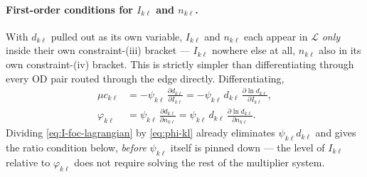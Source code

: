 \documentclass[12pt, a4paper]{article}
\theoremstyle{definition}
\theoremstyle{remark}
\begin{document}
\paragraph{First-order conditions for $I_{k\ell}$ and $n_{k\ell}$.} With $d_{k\ell}$ pulled out as its own variable, $I_{k\ell}$ and $n_{k\ell}$ each appear in $\mathcal L$ \emph{only} inside their own constraint-(iii) bracket — $I_{k\ell}$ nowhere else at all, $n_{k\ell}$ also in its own constraint-(iv) bracket. This is strictly simpler than differentiating through every OD pair routed through the edge directly. Differentiating,
\begin{align}
    \label{eq:I-foc-lagrangian}
\mu c_{k\ell} &= -\psi_{k\ell}\,\frac{\partial d_{k\ell}}{\partial I_{k\ell}} = -\psi_{k\ell}\,d_{k\ell}\,\frac{\partial \ln d_{k\ell}}{\partial I_{k\ell}}, \\
    \label{eq:phi-kl}
\varphi_{k\ell} &= \psi_{k\ell}\,\frac{\partial d_{k\ell}}{\partial n_{k\ell}} = \psi_{k\ell}\,d_{k\ell}\,\frac{\partial \ln d_{k\ell}}{\partial n_{k\ell}}.
\end{align}
Dividing \eqref{eq:I-foc-lagrangian} by \eqref{eq:phi-kl} already eliminates $\psi_{k\ell}d_{k\ell}$ and gives the ratio condition below, \emph{before} $\psi_{k\ell}$ itself is pinned down — the level of $I_{k\ell}$ relative to $\varphi_{k\ell}$ does not require solving the rest of the multiplier system.
\end{document}
